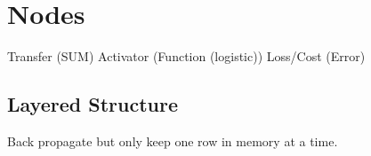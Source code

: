 
\chapter{Nodes}
Transfer (SUM)
Activator (Function (logistic))
Loss/Cost (Error)
\section{Layered Structure}
Back propagate but only keep one row in memory at a time.
